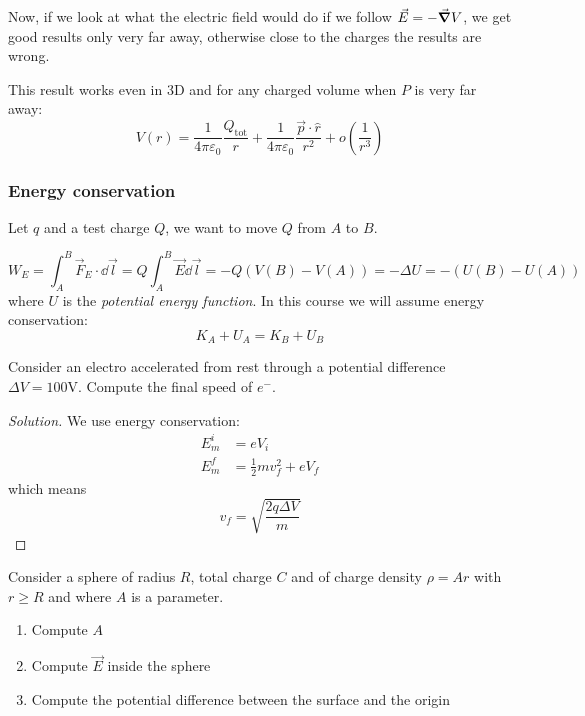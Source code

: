 \documentclass[12pt]{extarticle}
\begin{document}
Now, if we look at what the electric field would do if we follow $\vec E = - \grad V$, we get good results only very far away, otherwise close to the charges the results are wrong.

This result works even in 3D and for any charged volume when $P$ is very far away:
\begin{equation}
    V(r) = \frac{1}{4 \pi \varepsilon_0} \frac{Q_\text{tot}}{r} + \frac{1}{4 \pi \varepsilon_0} \frac{\vec p \cdot \hat r}{r^2} + o\left( \frac{1}{r^3} \right)
\end{equation}

\subsubsection{Energy conservation}

Let $q$ and a test charge $Q$, we want to move $Q$ from $A$ to $B$.

\begin{equation}
    W_E = \int_A^B \vec F_E \cdot \dd{\vec l} = Q \int_A^B \vec E \dd{\vec l} = - Q(V(B)- V(A)) = -\Delta U = - (U(B) - U(A))
\end{equation}
where $U$ is the \emph{potential energy function}.
In this course we will assume energy conservation:
\begin{equation}
    K_A + U_A = K_B + U_B
\end{equation}

\begin{example}{}{}
    Consider an electro accelerated from rest through a potential difference $\Delta V = 100 \si{\volt}$.
    Compute the final speed of $e^-$.
\end{example}

\begin{proof}[Solution]
    We use energy conservation:
    \begin{align}
        E_m^i & = e V_i                     \\
        E^f_m & = \frac{1}{2}mv_f^2 + e V_f
    \end{align}
    which means
    \begin{equation}
        v_f = \sqrt{\frac{2q \Delta V}{m}}
    \end{equation}
\end{proof}

\begin{example}{}{}
    Consider a sphere of radius $R$, total charge $C$ and of charge density $\rho = Ar$ with $r \geq R$ and where $A$ is a parameter.
    \begin{enumerate}
        \item Compute $A$
        \item Compute $\vec E$ inside the sphere
        \item Compute the potential difference between the surface and the origin
    \end{enumerate}
\end{example}
\end{document}
